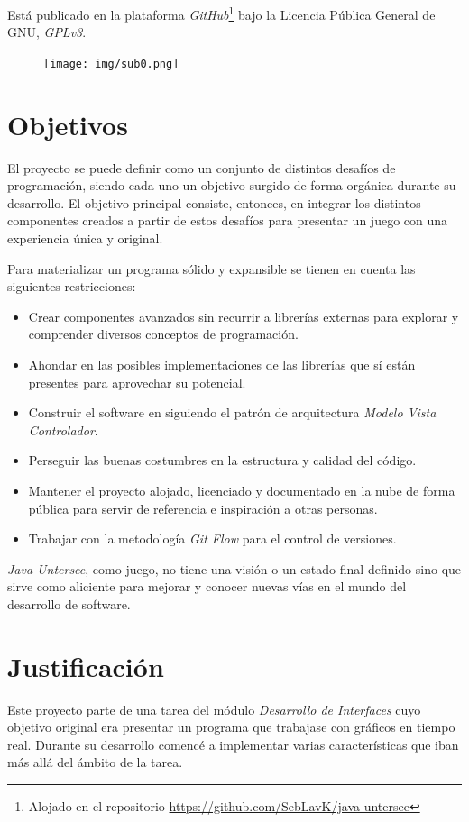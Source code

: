 \documentclass[a4paper,
	11pt,
	parskip=full,
	bibliography=totoc,
	twoside
	]{scrartcl}
\let\oldsection\section
\def\section{\cleardoubleoddpage\oldsection}
\begin{document}
	Está publicado en la plataforma \textit{GitHub}\footnote{Alojado en el repositorio \href{https://github.com/SebLavK/java-untersee}{https://github.com/SebLavK/java-untersee}} bajo la Licencia Pública General de GNU, \textit{GPLv3}.
	
	\vspace{5cm}
	\begin{figure}[h]
		\centering
		\texttt{[image: img/sub0.png]}
		\label{fig:submarine}
	\end{figure}

\section{Objetivos}
\label{sec:objetivos}
	El proyecto se puede definir como un conjunto de distintos desafíos de programación, siendo cada uno un objetivo surgido de forma orgánica durante su desarrollo. El objetivo principal consiste, entonces, en integrar los distintos componentes creados a partir de estos desafíos para presentar un juego con una experiencia única y original.
	
	Para materializar un programa sólido y expansible se tienen en cuenta las siguientes restricciones:
	\begin{itemize}[noitemsep]
		\item Crear componentes avanzados sin recurrir a librerías externas para explorar y comprender diversos conceptos de programación.
		\item Ahondar en las posibles implementaciones de las librerías que sí están presentes para aprovechar su potencial.
		\item Construir el software en siguiendo el patrón de arquitectura \textit{Modelo Vista Controlador}.
		\item Perseguir las buenas costumbres en la estructura y calidad del código.
		\item Mantener el proyecto alojado, licenciado y documentado en la nube de forma pública para servir de referencia e inspiración a otras personas.
		\item Trabajar con la metodología \textit{Git Flow} para el control de versiones.
	\end{itemize}
	
	\textit{Java Untersee}, como juego, no tiene una visión o un estado final definido sino que sirve como aliciente para mejorar y conocer nuevas vías en el mundo del desarrollo de software.

\section{Justificación}
\label{sec:justificacion}
	Este proyecto parte de una tarea del módulo \textit{Desarrollo de Interfaces} cuyo objetivo original era presentar un programa que trabajase con gráficos en tiempo real. Durante su desarrollo comencé a implementar varias características que iban más allá del ámbito de la tarea.
	
\end{document}
